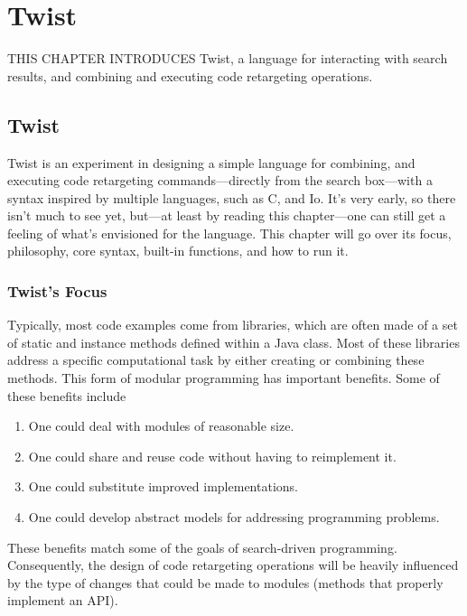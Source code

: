 \chapter{Twist}{}
\label{chap:twist}

\lettrine[lraise=0.1, nindent=0em, slope=-.5em]{T}{HIS CHAPTER INTRODUCES} Twist, a language for interacting with search results, and combining and executing code retargeting operations. 

\section{Twist}
\label{sec:twist}

Twist is an experiment in designing a simple language for combining, and executing code retargeting commands---directly from the search box---with a syntax inspired by multiple languages, such as C, and Io. It's very early, so there isn't much to see yet, but---at least by reading this chapter---one can still get a feeling of what's envisioned for the language. This chapter will go over its focus, philosophy, core syntax, built-in functions, and how to run it.

\subsection{Twist's Focus}
\label{sec:focus}

Typically, most code examples come from libraries, which are often made of a set of static and instance methods defined within a Java class. Most of these libraries address a specific computational task by either creating or combining these methods. This form of modular programming has important benefits\cite{Sedgewick:2011tx}. Some of these benefits include 

\begin{enumerate}
	\item One could deal with modules of reasonable size.
	\item One could share and reuse code without having to reimplement it.
	\item One could substitute improved implementations.
	\item One could develop abstract models for addressing programming problems.
\end{enumerate}

These benefits match some of the goals of search-driven programming. Consequently, the design of code retargeting operations will be heavily influenced by the type of changes that could be made to modules (methods that properly implement an API).

